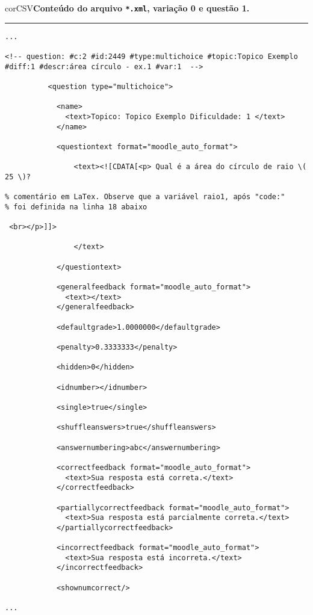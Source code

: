 \begin{myboxCode}{corCSV}{\textbf{Conteúdo do arquivo \texttt{*.xml}, variação 0 e questão 1.}}\vspace{3mm}
\hrule
{\scriptsize
\begin{verbatim}
...

<!-- question: #c:2 #id:2449 #type:multichoice #topic:Topico Exemplo #diff:1 #descr:área círculo - ex.1 #var:1  -->

          <question type="multichoice">

            <name>
              <text>Topico: Topico Exemplo Dificuldade: 1 </text>
            </name>
            
            <questiontext format="moodle_auto_format">
            
                <text><![CDATA[<p> Qual é a área do círculo de raio \( 25 \)?

% comentário em LaTex. Observe que a variável raio1, após "code:" 
% foi definida na linha 18 abaixo

 <br></p>]]>
 
                </text>

            </questiontext>

            <generalfeedback format="moodle_auto_format">
              <text></text>
            </generalfeedback>
            
            <defaultgrade>1.0000000</defaultgrade>
            
            <penalty>0.3333333</penalty>

            <hidden>0</hidden>
            
            <idnumber></idnumber>
            
            <single>true</single>
            
            <shuffleanswers>true</shuffleanswers>
            
            <answernumbering>abc</answernumbering>
            
            <correctfeedback format="moodle_auto_format">
              <text>Sua resposta está correta.</text>
            </correctfeedback>
            
            <partiallycorrectfeedback format="moodle_auto_format">
              <text>Sua resposta está parcialmente correta.</text>
            </partiallycorrectfeedback>
            
            <incorrectfeedback format="moodle_auto_format">
              <text>Sua resposta está incorreta.</text>
            </incorrectfeedback>

            <shownumcorrect/>    
            
...
\end{verbatim}
}
\end{myboxCode}


